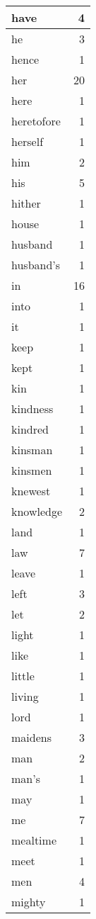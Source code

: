 \begin{center}
\begin{longtable}{l|r}
have & 4 \\ \hline
he & 3 \\ \hline
hence & 1 \\ \hline
her & 20 \\ \hline
here & 1 \\ \hline
heretofore & 1 \\ \hline
herself & 1 \\ \hline
him & 2 \\ \hline
his & 5 \\ \hline
hither & 1 \\ \hline
house & 1 \\ \hline
husband & 1 \\ \hline
husband's & 1 \\ \hline
in & 16 \\ \hline
into & 1 \\ \hline
it & 1 \\ \hline
keep & 1 \\ \hline
kept & 1 \\ \hline
kin & 1 \\ \hline
kindness & 1 \\ \hline
kindred & 1 \\ \hline
kinsman & 1 \\ \hline
kinsmen & 1 \\ \hline
knewest & 1 \\ \hline
knowledge & 2 \\ \hline
land & 1 \\ \hline
law & 7 \\ \hline
leave & 1 \\ \hline
left & 3 \\ \hline
let & 2 \\ \hline
light & 1 \\ \hline
like & 1 \\ \hline
little & 1 \\ \hline
living & 1 \\ \hline
lord & 1 \\ \hline
maidens & 3 \\ \hline
man & 2 \\ \hline
man's & 1 \\ \hline
may & 1 \\ \hline
me & 7 \\ \hline
mealtime & 1 \\ \hline
meet & 1 \\ \hline
men & 4 \\ \hline
mighty & 1 \\ \hline

\end{longtable}
\end{center}

